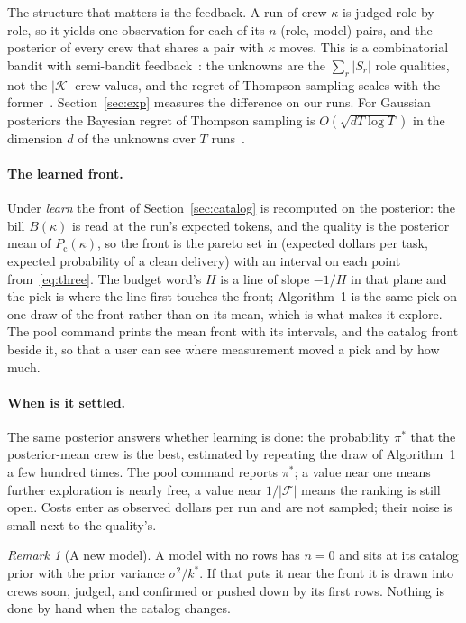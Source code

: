 \documentclass[10pt,a4paper]{article}
\newcommand{\crews}{\mathcal{K}}
\newcommand{\front}{\mathcal{F}}
\newcommand{\pclean}{P_{\mathrm{c}}}
\theoremstyle{definition}
\theoremstyle{remark}
\newtheorem{remark}{Remark}
\begin{document}
The structure that matters is the feedback. A run of crew $\kappa$ is judged role by role, so it yields one observation for each of its $n$ (role, model) pairs, and the posterior of every crew that shares a pair with $\kappa$ moves. This is a combinatorial bandit with semi-bandit feedback~\cite{chen2013,wen2015}: the unknowns are the $\sum_r|S_r|$ role qualities, not the $|\crews|$ crew values, and the regret of Thompson sampling scales with the former~\cite{wen2015}. Section~\ref{sec:exp} measures the difference on our runs. For Gaussian posteriors the Bayesian regret of Thompson sampling is $O(\sqrt{dT\log T})$ in the dimension $d$ of the unknowns over $T$ runs~\cite{russo2014}.

\paragraph{The learned front.}
Under \emph{learn} the front of Section~\ref{sec:catalog} is recomputed on the posterior: the bill $B(\kappa)$ is read at the run's expected tokens, and the quality is the posterior mean of $\pclean(\kappa)$, so the front is the pareto set in (expected dollars per task, expected probability of a clean delivery) with an interval on each point from~\eqref{eq:three}. The budget word's $H$ is a line of slope $-1/H$ in that plane and the pick is where the line first touches the front; Algorithm~1 is the same pick on one draw of the front rather than on its mean, which is what makes it explore. The pool command prints the mean front with its intervals, and the catalog front beside it, so that a user can see where measurement moved a pick and by how much.

\paragraph{When is it settled.}
The same posterior answers whether learning is done: the probability $\pi^\ast$ that the posterior-mean crew is the best, estimated by repeating the draw of Algorithm~1 a few hundred times. The pool command reports $\pi^\ast$; a value near one means further exploration is nearly free, a value near $1/|\front|$ means the ranking is still open. Costs enter as observed dollars per run and are not sampled; their noise is small next to the quality's.

\begin{remark}[A new model]
A model with no rows has $n=0$ and sits at its catalog prior with the prior variance $\sigma^2/k^{\ast}$. If that puts it near the front it is drawn into crews soon, judged, and confirmed or pushed down by its first rows. Nothing is done by hand when the catalog changes.
\end{remark}
\end{document}
